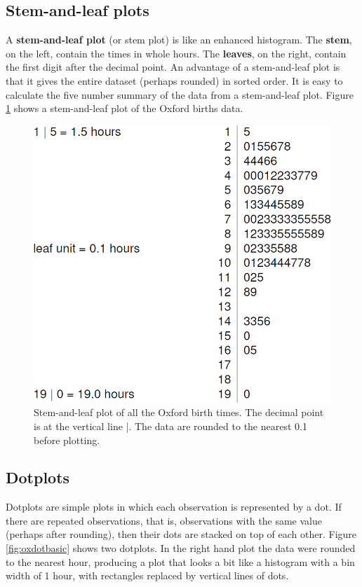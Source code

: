 \documentclass[
  british,
]{book}
\begin{document}
\hypertarget{stem}{%
\subsection{Stem-and-leaf plots}\label{stem}}

A \textbf{stem-and-leaf plot} (or stem plot) is like an enhanced histogram. The \textbf{stem}, on the left, contain the times in whole hours. The \textbf{leaves},
on the right, contain the first digit after the decimal point. An advantage of a stem-and-leaf plot is that it gives the entire dataset (perhaps rounded) in sorted order. It is easy to calculate the five number summary of the data from a stem-and-leaf plot. Figure \ref{fig:oxstem} shows a stem-and-leaf plot of the Oxford births data.

\begin{figure}

{\centering \includegraphics[width=0.8\linewidth]{images/ox_stem} 

}

\caption{Stem-and-leaf plot of all the Oxford birth times. The decimal point is at the vertical line |. The data are rounded to the nearest 0.1 before plotting.}\label{fig:oxstem}
\end{figure}
\FloatBarrier

\hypertarget{dotplots}{%
\subsection{Dotplots}\label{dotplots}}

Dotplots are simple plots in which each observation is represented by a dot. If there are repeated observations, that is, observations with the same value (perhaps after rounding), then their dots are stacked on top of each other. Figure \ref{fig:oxdotbasic} shows two dotplots. In the right hand plot the data were rounded to the nearest hour, producing a plot that looks a bit like a histogram with a bin width of 1 hour, with rectangles replaced by vertical lines of dots.
\end{document}
